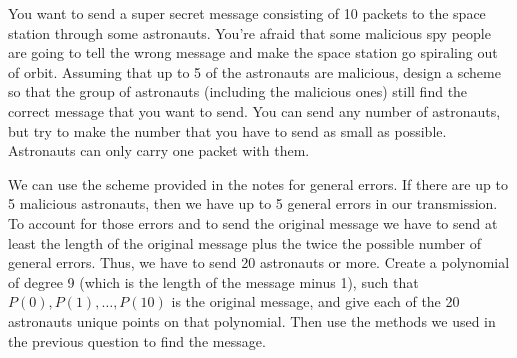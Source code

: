 \question You want to send a super secret message consisting of 10 
packets to the space station through some  astronauts. You’re afraid 
that some malicious spy people are going to tell the wrong message and 
make the space station go spiraling out of orbit. Assuming that up to 
5 of the astronauts are malicious, design a scheme so that the group of 
astronauts (including the malicious ones) still find the correct message 
that you want to send. You can send any number of astronauts, but try to 
make the number that you have to send as small as possible. Astronauts 
can only carry one packet with them.
\begin{solution}[2 in]
We can use the scheme provided in the notes for general errors. If 
there are up to 5 malicious astronauts, then we have up to 5 general 
errors in our transmission. To account for those errors and to send 
the original message we have to send at least the length of the original 
message plus the twice the possible number of general errors. Thus, 
we have to send 20 astronauts or more. Create a polynomial of degree 
9 (which is the length of the message minus 1), such that $P(0), P(1), 
\dotsc, P(10)$ is the original message, and give each of the 20 
astronauts unique points on that polynomial. Then use the methods we 
used in the previous question to find the message.
\end{solution}